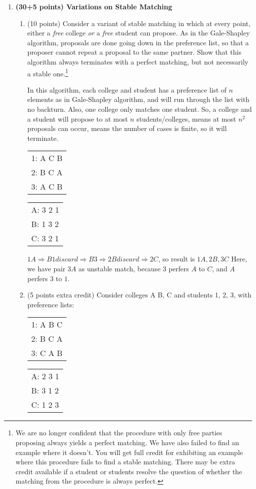 \documentclass{article}
\begin{document}
\begin{enumerate}[topsep=0pt]
  
\item \textbf{(30+5 points) Variations on Stable Matching}

\begin{enumerate}
\item (10 points) Consider a variant of stable matching in which at every point, either a \emph{free} college \emph{or} a \emph{free} student can propose. As in the Gale-Shapley algorithm, proposals are done going down in the preference list, so that a proposer cannot repeat a proposal to the same partner. 
Show that this algorithm always terminates with a perfect matching,
but not necessarily a stable one.\footnote{We are no longer confident that the procedure with only free parties proposing always yields a perfect matching.  We have also failed to find an example where it doesn't.  You will get full credit for exhibiting an example where this procedure fails to find a stable matching.  There may be extra credit available if a student or students resolve the question of whether the matching from the procedure is always perfect.}


In this algorithm, each college and student has a preference list of $n$ elements as in Gale-Shapley algorithm, and will run through the list with no backturn. Also, one college only matches one student. So, a college and a student will propose to at most $n$ students/colleges, means at most $n^2$ proposals can occur, means the number of cases is finite, so it will terminate.

\begin{tabular}{l}
  1: A C B\\
  2: B C A\\
  3: A C B
\end{tabular}
\begin{tabular}{l}
  A: 3 2 1\\
  B: 1 3 2\\
  C: 3 2 1
\end{tabular}
$1A\Rightarrow B1 discard\Rightarrow B3\Rightarrow 2B discard\Rightarrow 2C$, so result is $1A,2B,3C$
Here, we have pair $3A$ as unstable match, because $3$ perfers $A$ to $C$, and $A$ perfers $3$ to $1$.


\item (5 points extra credit)
Consider colleges A B, C and students 1, 2, 3, with preference lists:
\begin{tabular}{l}
1: A B C\\
2: B C A\\
3: C A B
\end{tabular}  
\begin{tabular}{l}
A: 2 3 1\\
B: 3 1 2\\
C: 1 2 3
\end{tabular}


\end{enumerate}
\end{enumerate}
\end{document}
